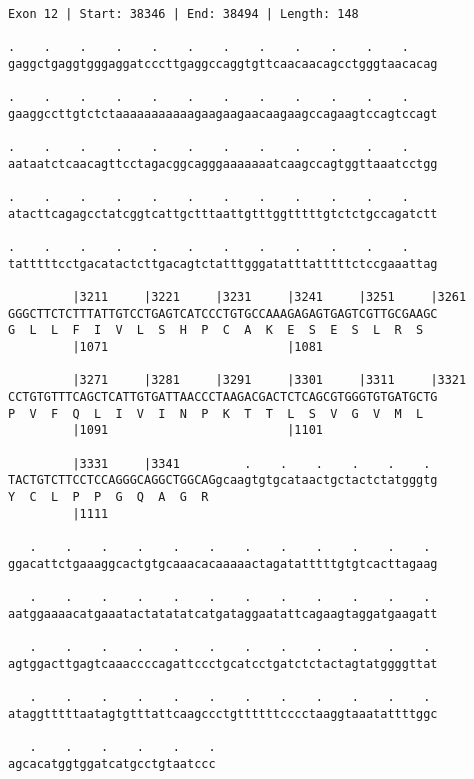 \documentclass{article}
\begin{document}
\begin{Verbatim}
Exon 12 | Start: 38346 | End: 38494 | Length: 148
 
.    .    .    .    .    .    .    .    .    .    .    .    
gaggctgaggtgggaggatcccttgaggccaggtgttcaacaacagcctgggtaacacag
  
.    .    .    .    .    .    .    .    .    .    .    .    
gaaggccttgtctctaaaaaaaaaaagaagaagaacaagaagccagaagtccagtccagt
  
.    .    .    .    .    .    .    .    .    .    .    .    
aataatctcaacagttcctagacggcagggaaaaaaatcaagccagtggttaaatcctgg
  
.    .    .    .    .    .    .    .    .    .    .    .    
atacttcagagcctatcggtcattgctttaattgtttggtttttgtctctgccagatctt
  
.    .    .    .    .    .    .    .    .    .    .    .    
tatttttcctgacatactcttgacagtctatttgggatatttatttttctccgaaattag
  
         |3211     |3221     |3231     |3241     |3251     |3261
GGGCTTCTCTTTATTGTCCTGAGTCATCCCTGTGCCAAAGAGAGTGAGTCGTTGCGAAGC
G  L  L  F  I  V  L  S  H  P  C  A  K  E  S  E  S  L  R  S  
         |1071                         |1081                
  
         |3271     |3281     |3291     |3301     |3311     |3321
CCTGTGTTTCAGCTCATTGTGATTAACCCTAAGACGACTCTCAGCGTGGGTGTGATGCTG
P  V  F  Q  L  I  V  I  N  P  K  T  T  L  S  V  G  V  M  L  
         |1091                         |1101                
  
         |3331     |3341         .    .    .    .    .    . 
TACTGTCTTCCTCCAGGGCAGGCTGGCAGgcaagtgtgcataactgctactctatgggtg
Y  C  L  P  P  G  Q  A  G  R                                
         |1111                                              
  
   .    .    .    .    .    .    .    .    .    .    .    . 
ggacattctgaaaggcactgtgcaaacacaaaaactagatatttttgtgtcacttagaag
  
   .    .    .    .    .    .    .    .    .    .    .    . 
aatggaaaacatgaaatactatatatcatgataggaatattcagaagtaggatgaagatt
  
   .    .    .    .    .    .    .    .    .    .    .    . 
agtggacttgagtcaaaccccagattccctgcatcctgatctctactagtatggggttat
  
   .    .    .    .    .    .    .    .    .    .    .    . 
ataggtttttaatagtgtttattcaagccctgttttttcccctaaggtaaatattttggc
  
   .    .    .    .    .    .
agcacatggtggatcatgcctgtaatccc
\end{Verbatim}
\end{document}
